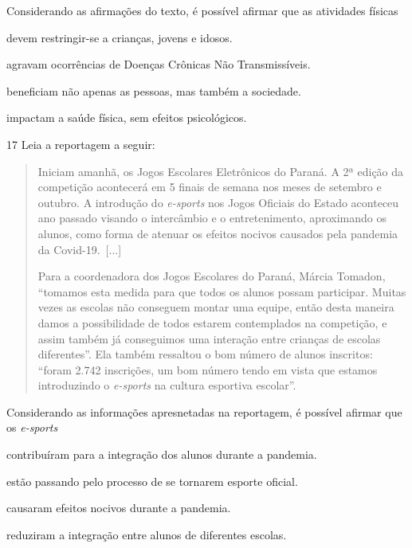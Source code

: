 Considerando as afirmações do texto, é possível afirmar que as atividades
físicas

\begin{escolha}
\item devem restringir-se a crianças, jovens e idosos.

\item agravam ocorrências de Doenças Crônicas Não Transmissíveis.

\item beneficiam não apenas as pessoas, mas também a sociedade.

\item impactam a saúde física, sem efeitos psicológicos.
\end{escolha}

\num{17}  Leia a reportagem a seguir:

\begin{quote}
Iniciam amanhã, os Jogos Escolares Eletrônicos do Paraná. A 2ª edição da
competição acontecerá em 5 finais de semana nos meses de setembro e
outubro. A introdução do \textit{e-sports} nos Jogos Oficiais do Estado aconteceu
ano passado visando o intercâmbio e o entretenimento, aproximando os
alunos, como forma de atenuar os efeitos nocivos causados pela pandemia
da Covid-19.~{[}...{]}

Para a coordenadora dos Jogos Escolares do Paraná, Márcia Tomadon,
``tomamos esta medida para que todos os alunos possam participar. Muitas
vezes as escolas não conseguem montar uma equipe, então desta maneira
damos a possibilidade de todos estarem contemplados na competição, e
assim também já conseguimos uma interação entre crianças de escolas
diferentes''. Ela também ressaltou o bom número de alunos inscritos:
``foram 2.742 inscrições, um bom número tendo em vista que estamos
introduzindo o \textit{e-sports} na cultura esportiva escolar''.

\end{quote}

\pagebreak
Considerando as informações apresnetadas na reportagem, é possível afirmar
que os \textit{e-sports}

\begin{escolha}
\item contribuíram para a integração dos alunos durante a pandemia.

\item estão passando pelo processo de se tornarem esporte oficial.  

\item causaram efeitos nocivos durante a pandemia.

\item reduziram a integração entre alunos de diferentes escolas.
\end{escolha}

